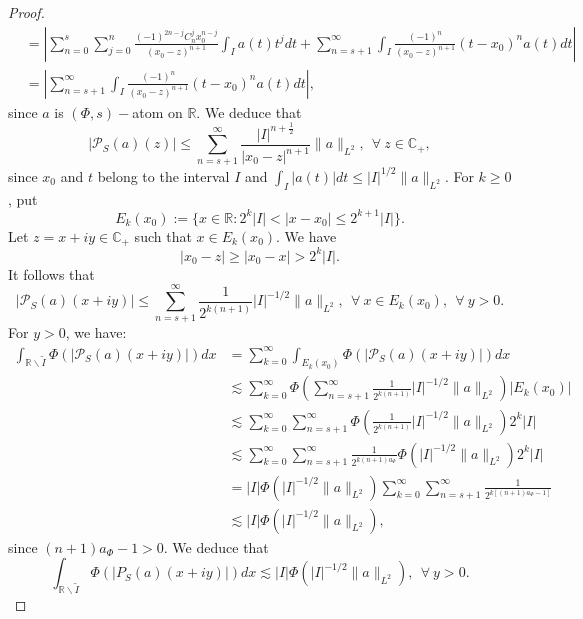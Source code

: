 \documentclass[a4paper,12pt,intlimits,oneside]{amsart}
\theoremstyle{definition}
\numberwithin{equation}{section}
\theoremstyle{definition}
\begin{document}
\begin{proof}
\begin{align*}
&=\left|\sum_{n=0}^{s}\sum_{j=0}^{n}\frac{(-1)^{2n-j}C_{n}^{j}x_{0}^{n-j}}{(x_{0}-z)^{n+1}}\int_{I}a(t)t^{j}dt + \sum_{n=s+1}^{\infty}  \int_{I}\frac{(-1)^{n}}{(x_{0}-z)^{n+1}}(t-x_{0})^{n} a(t)dt    \right| \\
&=\left|\sum_{n=s+1}^{\infty}  \int_{I}\frac{(-1)^{n}}{(x_{0}-z)^{n+1}}(t-x_{0})^{n} a(t)dt    \right|, 
\end{align*}
since $a$ is   $(\Phi,s)-$atom on $\mathbb{R}$. We deduce that 
\begin{equation}\label{eq:dtka2}
 |\mathcal{P}_{S}(a)(z)| \leq  \sum_{n=s+1}^{\infty} \frac{|I|^{n+\frac{1}{2}}}{|x_{0}-z|^{n+1}}\| a\|_{L^{2}}, ~~\forall~ z\in \mathbb{C}_{+},
\end{equation}
since $x_{0}$ and $t$ belong to the interval $I$ and $\int_{I}|a(t)|dt \leq |I|^{1/2}\| a\|_{L^{2}}$.
For $k \geq 0$, put $$ E_{k}(x_{0}):= \{ x \in \mathbb{R}: 2^{k}|I| < |x-x_{0}| \leq 2^{k+1}|I|  \}.    $$
Let $z=x+iy\in \mathbb{C}_{+}$ such that  $x \in E_{k}(x_{0})$. We have
$$ |x_{0}-z| \geq |x_{0}-x| > 2^{k}|I|.   $$
It follows that
\begin{equation}\label{eq:dtkoa2}
 |\mathcal{P}_{S}(a)(x+iy)| \leq \sum_{n=s+1}^{\infty} \frac{1}{2^{k(n+1)}}|I|^{-1/2}\| a\|_{L^{2}}, ~~\forall~x \in E_{k}(x_{0}), ~~\forall~y>0.
\end{equation}
For $y>0$, we have: 
\begin{align*}
\int_{\mathbb{R}\backslash \widetilde{I}}\Phi( |\mathcal{P}_{S}(a)(x+iy)|)dx &= \sum_{k=0}^{\infty} \int_{E_{k}(x_{0})}\Phi( |\mathcal{P}_{S}(a)(x+iy)|)dx \\
&\lesssim \sum_{k=0}^{\infty} \Phi\left( \sum_{n=s+1}^{\infty} \frac{1}{2^{k(n+1)}}|I|^{-1/2}\| a\|_{L^{2}}\right)|E_{k}(x_{0})| \\
&\lesssim \sum_{k=0}^{\infty} \sum_{n=s+1}^{\infty}\Phi\left(  \frac{1}{2^{k(n+1)}}|I|^{-1/2}\| a\|_{L^{2}}\right)2^{k}|I| \\
&\lesssim \sum_{k=0}^{\infty} \sum_{n=s+1}^{\infty}\frac{1}{2^{k(n+1)a_{\Phi}}}\Phi\left( |I|^{-1/2}\| a\|_{L^{2}}\right)2^{k}|I| \\
&= |I|\Phi\left( |I|^{-1/2}\| a\|_{L^{2}}\right)\sum_{k=0}^{\infty} \sum_{n=s+1}^{\infty}\frac{1}{2^{k[(n+1)a_{\Phi}-1]}} \\
&\lesssim |I|\Phi\left( |I|^{-1/2}\| a\|_{L^{2}}\right), 
\end{align*}
since  $(n+1)a_{\Phi}-1 >0$. We deduce that 
\begin{equation}\label{eq:dtkoaqa2}
 \int_{\mathbb{R}\backslash \widetilde{I}}\Phi( |P_{S}(a)(x+iy)|)dx \lesssim |I|\Phi\left( |I|^{-1/2}\| a\|_{L^{2}}\right), ~~\forall~y>0.
 \end{equation}
\end{proof} 
\end{document}
